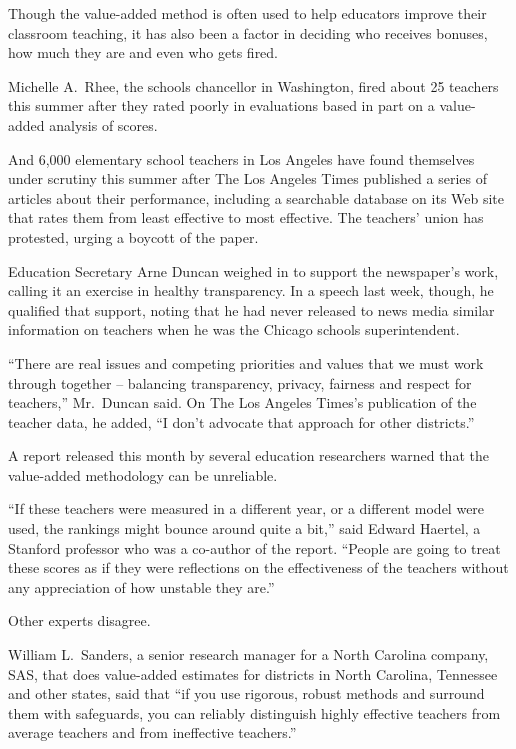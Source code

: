 ﻿\documentclass[12pt]{article}
\begin{document}
Though the value-added method is often used to help educators improve their classroom teaching, it
has also been a factor in deciding who receives bonuses, how much they are and even who gets fired.

Michelle A.~Rhee, the schools chancellor in Washington, fired about 25 teachers this summer after
they rated poorly in evaluations based in part on a value-added analysis of scores.

And 6,000 elementary school teachers in Los Angeles have found themselves under scrutiny this summer
after The Los Angeles Times published a series of articles about their performance, including a
searchable database on its Web site that rates them from least effective to most effective. The
teachers' union has protested, urging a boycott of the paper.

Education Secretary Arne Duncan weighed in to support the newspaper's work, calling it an exercise
in healthy transparency. In a speech last week, though, he qualified that support, noting that he
had never released to news media similar information on teachers when he was the Chicago schools
superintendent.

``There are real issues and competing priorities and values that we must work through together --
balancing transparency, privacy, fairness and respect for teachers,'' Mr.~Duncan said. On The Los
Angeles Times's publication of the teacher data, he added, ``I don't advocate that approach for
other districts.''

A report released this month by several education researchers warned that the value-added
methodology can be unreliable.

``If these teachers were measured in a different year, or a different model were used, the rankings
might bounce around quite a bit,'' said Edward Haertel, a Stanford professor who was a co-author of
the report. ``People are going to treat these scores as if they were reflections on the
effectiveness of the teachers without any appreciation of how unstable they are.''

Other experts disagree.

William L.~Sanders, a senior research manager for a North Carolina company, SAS, that does
value-added estimates for districts in North Carolina, Tennessee and other states, said that ``if
you use rigorous, robust methods and surround them with safeguards, you can reliably distinguish
highly effective teachers from average teachers and from ineffective teachers.''
\end{document}
